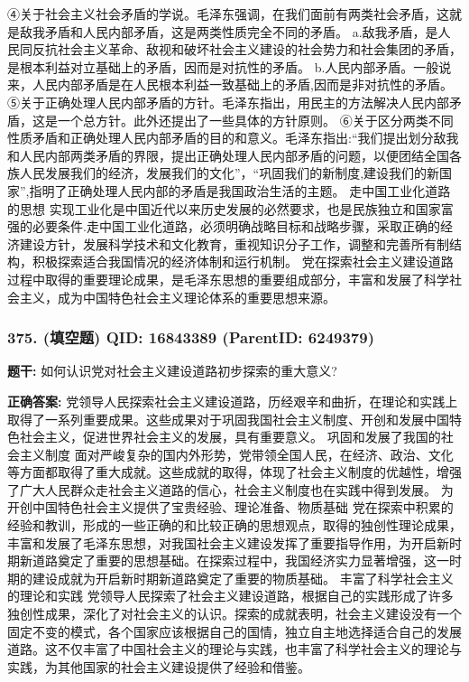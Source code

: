\documentclass[12pt,UTF8]{ctexart}
\begin{document}
④关于社会主义社会矛盾的学说。毛泽东强调，在我们面前有两类社会矛盾，这就是敌我矛盾和人民内部矛盾，这是两类性质完全不同的矛盾。
a.敌我矛盾，是人民同反抗社会主义革命、敌视和破坏社会主义建设的社会势力和社会集团的矛盾，是根本利益对立基础上的矛盾，因而是对抗性的矛盾。
b.人民内部矛盾。一般说来，人民内部矛盾是在人民根本利益一致基础上的矛盾,因而是非对抗性的矛盾。
⑤关于正确处理人民内部矛盾的方针。毛泽东指出，用民主的方法解决人民内部矛盾，这是一个总方针。此外还提出了一些具体的方针原则。
⑥关于区分两类不同性质矛盾和正确处理人民内部矛盾的目的和意义。毛泽东指出:“我们提出划分敌我和人民内部两类矛盾的界限，提出正确处理人民内部矛盾的问题，以便团结全国各族人民发展我们的经济，发展我们的文化”，“巩固我们的新制度,建设我们的新国家”,指明了正确处理人民内部的矛盾是我国政治生活的主题。
走中国工业化道路的思想
实现工业化是中国近代以来历史发展的必然要求，也是民族独立和国家富强的必要条件.走中国工业化道路，必须明确战略目标和战略步骤，采取正确的经济建设方针，发展科学技术和文化教育，重视知识分子工作，调整和完善所有制结构，积极探索适合我国情况的经济体制和运行机制。
党在探索社会主义建设道路过程中取得的重要理论成果，是毛泽东思想的重要组成部分，丰富和发展了科学社会主义，成为中国特色社会主义理论体系的重要思想来源。

\vspace{0.3em}\hrulefill\vspace{0.7em}

\subsubsection*{375. (填空题) \small QID: 16843389 (ParentID: 6249379)}

\textbf{题干:}
如何认识党对社会主义建设道路初步探索的重大意义?



\textbf{正确答案:}
党领导人民探索社会主义建设道路，历经艰辛和曲折，在理论和实践上取得了一系列重要成果。这些成果对于巩固我国社会主义制度、开创和发展中国特色社会主义，促进世界社会主义的发展，具有重要意义。
巩固和发展了我国的社会主义制度
面对严峻复杂的国内外形势，党带领全国人民，在经济、政治、文化等方面都取得了重大成就。这些成就的取得，体现了社会主义制度的优越性，增强了广大人民群众走社会主义道路的信心，社会主义制度也在实践中得到发展。
为开创中国特色社会主义提供了宝贵经验、理论准备、物质基础
党在探索中积累的经验和教训，形成的一些正确的和比较正确的思想观点，取得的独创性理论成果，丰富和发展了毛泽东思想，对我国社会主义建设发挥了重要指导作用，为开启新时期新道路奠定了重要的思想基础。在探索过程中，我国经济实力显著增强，这一时期的建设成就为开启新时期新道路奠定了重要的物质基础。
丰富了科学社会主义的理论和实践
党领导人民探索了社会主义建设道路，根据自己的实践形成了许多独创性成果，深化了对社会主义的认识。探索的成就表明，社会主义建设没有一个固定不变的模式，各个国家应该根据自己的国情，独立自主地选择适合自己的发展道路。这不仅丰富了中国社会主义的理论与实践，也丰富了科学社会主义的理论与实践，为其他国家的社会主义建设提供了经验和借鉴。
\end{document}
